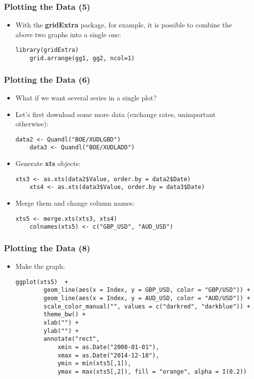 \documentclass[10pt]{beamer}
\theoremstyle{definition}
\begin{document}
\begin{frame}[fragile]
\frametitle{Plotting the Data (5)}
\begin{itemize}
	\item With the \textbf{gridExtra} package, for example, it is possible to combine the above two graphs into a single one:
	\begin{lstlisting}[style = rstyle, breaklines]
	library(gridExtra)
	grid.arrange(gg1, gg2, ncol=1) 
	\end{lstlisting}
\end{itemize}
\end{frame}

\begin{frame}[fragile]
\frametitle{Plotting the Data (6)}
\begin{itemize}
	\item What if we want several series in a single plot?
	\item Let's first download some more data (exchange rates, unimportant otherwise):
	\begin{lstlisting}[style = rstyle, breaklines]
	data2 <- Quandl("BOE/XUDLGBD")
	data3 <- Quandl("BOE/XUDLADD")
	\end{lstlisting}
	\item Generate \textbf{xts} objects:
	\begin{lstlisting}[style = rstyle, breaklines]
	xts3 <- as.xts(data2$Value, order.by = data2$Date)
	xts4 <- as.xts(data3$Value, order.by = data3$Date)
	\end{lstlisting}
	\item Merge them and change column names:
	\begin{lstlisting}[style = rstyle, breaklines]
	xts5 <- merge.xts(xts3, xts4)
	colnames(xts5) <- c("GBP_USD", "AUD_USD")
	\end{lstlisting}
\end{itemize}
\end{frame}

\begin{frame}[fragile]
\frametitle{Plotting the Data (8)}
\begin{itemize}
	
	\item Make the graph:
	\begin{lstlisting}[style = rstyle, breaklines]
	ggplot(xts5)  +
		geom_line(aes(x = Index, y = GBP_USD, color = "GBP/USD")) +
		geom_line(aes(x = Index, y = AUD_USD, color = "AUD/USD")) +
		scale_color_manual("", values = c("darkred", "darkblue")) + 
		theme_bw() + 
		xlab("") + 
		ylab("") +
		annotate("rect", 
        	xmin = as.Date("2008-01-01"),
        	xmax = as.Date("2014-12-18"),
        	ymin = min(xts5[,1]),
        	ymax = max(xts5[,2]), fill = "orange", alpha = I(0.2))
	\end{lstlisting}
\end{itemize}
\end{frame}
\end{document}
